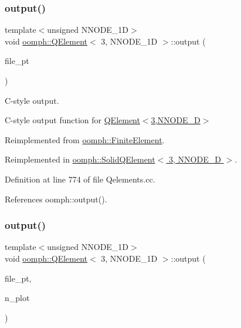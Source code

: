 \subsubsection{\texorpdfstring{output()}{output()}\hspace{0.1cm}{\footnotesize\ttfamily [3/4]}}
{\footnotesize\ttfamily template$<$unsigned N\+N\+O\+D\+E\+\_\+1D$>$ \\
void \hyperlink{classoomph_1_1QElement}{oomph\+::\+Q\+Element}$<$ 3, N\+N\+O\+D\+E\+\_\+1D $>$\+::output (\begin{DoxyParamCaption}\item[{F\+I\+LE $\ast$}]{file\+\_\+pt }\end{DoxyParamCaption})\hspace{0.3cm}{\ttfamily [virtual]}}



C-\/style output. 

C-\/style output function for \hyperlink{classoomph_1_1QElement_3_013_00_01NNODE__1D_01_4}{Q\+Element$<$3,\+N\+N\+O\+D\+E\+\_\+D$>$} 

Reimplemented from \hyperlink{classoomph_1_1FiniteElement_a72cddd09f8ddbee1a20a1ff404c6943e}{oomph\+::\+Finite\+Element}.



Reimplemented in \hyperlink{classoomph_1_1SolidQElement_3_013_00_01NNODE__1D_01_4_aa31ca4d1e3f97ba0a062141707d7aaf3}{oomph\+::\+Solid\+Q\+Element$<$ 3, N\+N\+O\+D\+E\+\_\+D $>$}.



Definition at line 774 of file Qelements.\+cc.



References oomph\+::output().

\mbox{\label{classoomph_1_1QElement_3_013_00_01NNODE__1D_01_4_a48a7cbdd3fb6baaeed2f009ef4d1985b}} 
\subsubsection{\texorpdfstring{output()}{output()}\hspace{0.1cm}{\footnotesize\ttfamily [4/4]}}
{\footnotesize\ttfamily template$<$unsigned N\+N\+O\+D\+E\+\_\+1D$>$ \\
void \hyperlink{classoomph_1_1QElement}{oomph\+::\+Q\+Element}$<$ 3, N\+N\+O\+D\+E\+\_\+1D $>$\+::output (\begin{DoxyParamCaption}\item[{F\+I\+LE $\ast$}]{file\+\_\+pt,  }\item[{const unsigned \&}]{n\+\_\+plot }\end{DoxyParamCaption})\hspace{0.3cm}{\ttfamily [virtual]}}



